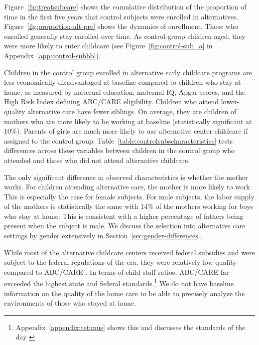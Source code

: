 Figure~\ref{fig:treatsubcare} shows the cumulative distribution of the proportion of time in the first five years that control subjects were enrolled in alternatives. Figure~\ref{fig:proportion-alt-pre} shows the dynamics of enrollment. Those who enrolled generally stay enrolled over time. As control-group children aged, they were more likely to enter childcare (see Figure~\ref{fig:control-sub_a} in Appendix~\ref{app:control-subbb}).

Children in the control group enrolled in alternative early childcare programs are less economically disadvantaged at baseline compared to children who stay at home, as measured by maternal education, maternal IQ, Apgar scores, and the High Risk Index defining ABC/CARE eligibility. Children who attend lower-quality alternative care have fewer siblings. On average, they are children of mothers who are more likely to be working at baseline (statistically significant at 10\%). Parents of girls are much more likely to use alternative center childcare if assigned to the control group. Table~\ref{table:controlsubscharacteristics} tests differences across these variables between children in the control group who attended and those who did not attend alternative childcare. 

The only significant difference in observed characteristics is whether the mother works. For children attending alternative care, the mother is more likely to work. This is especially the case for female subjects. For male subjects, the labor supply of the mothers is statistically the same with 14\% of the mothers working for boys who stay at home. This is consistent with a higher percentage of fathers being present when the subject is male. We discuss the selection into alternative care settings by gender extensively in Section~\ref{sec:gender-differences},

While most of the alternative childcare centers received federal subsidies and were subject to the federal regulations of the era, they were relatively low-quality compared to ABC/CARE \citep{Burchinal_etal_1989_CD_Daycare-Pre-K-Dev}. In terms of child-staff ratios, ABC/CARE far exceeded the highest state and federal standards.\footnote{Appendix~\ref{appendix:tetanus} shows this and discusses the standards of the day \citep{Department-of-Health_1968_DayCareRequirements,NCGA_1971_House-Bill-100,Ramey-et-al_1977_Intro-to-ABC,Ramey_Campbell_1979_SR,Ramey_McGinness_etal_1982_Abecedarianapproach,Burchinal_Campbell_etal_1997_CD}} We do not have baseline information on the quality of the home care to be able to precisely analyze the environments of those who stayed at home. 

